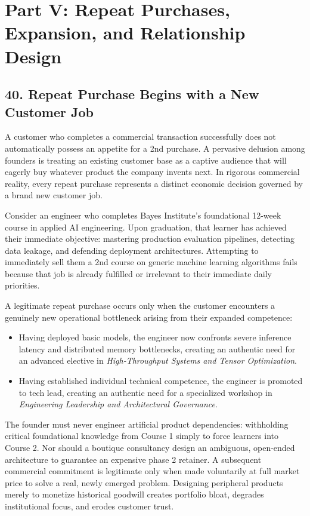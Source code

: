 \section*{Part V: Repeat Purchases, Expansion, and Relationship Design}

\subsection*{40. Repeat Purchase Begins with a New Customer Job}

A customer who completes a commercial transaction successfully does not automatically possess an appetite for a 2nd purchase. A pervasive delusion among founders is treating an existing customer base as a captive audience that will eagerly buy whatever product the company invents next. In rigorous commercial reality, every repeat purchase represents a distinct economic decision governed by a brand new customer job.

Consider an engineer who completes Bayes Institute's foundational 12-week course in applied AI engineering. Upon graduation, that learner has achieved their immediate objective: mastering production evaluation pipelines, detecting data leakage, and defending deployment architectures. Attempting to immediately sell them a 2nd course on generic machine learning algorithms fails because that job is already fulfilled or irrelevant to their immediate daily priorities. 

A legitimate repeat purchase occurs only when the customer encounters a genuinely new operational bottleneck arising from their expanded competence:
\begin{itemize}[leftmargin=*]
\item Having deployed basic models, the engineer now confronts severe inference latency and distributed memory bottlenecks, creating an authentic need for an advanced elective in \textit{High-Throughput Systems and Tensor Optimization}.
\item Having established individual technical competence, the engineer is promoted to tech lead, creating an authentic need for a specialized workshop in \textit{Engineering Leadership and Architectural Governance}.
\end{itemize}

The founder must never engineer artificial product dependencies: withholding critical foundational knowledge from Course 1 simply to force learners into Course 2. Nor should a boutique consultancy design an ambiguous, open-ended architecture to guarantee an expensive phase 2 retainer. A subsequent commercial commitment is legitimate only when made voluntarily at full market price to solve a real, newly emerged problem. Designing peripheral products merely to monetize historical goodwill creates portfolio bloat, degrades institutional focus, and erodes customer trust.


